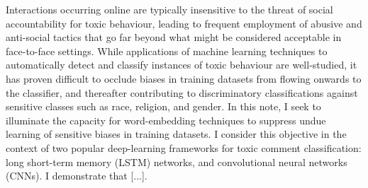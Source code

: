 Interactions occurring online are typically insensitive to the threat of social accountability for toxic behaviour, leading to frequent employment of abusive and anti-social tactics that go far beyond what might be considered acceptable in face-to-face settings. 
While applications of machine learning techniques to automatically detect and classify instances of toxic behaviour are well-studied, it has proven difficult to occlude biases in training datasets from flowing onwards to the classifier, and thereafter contributing to discriminatory classifications against sensitive classes such as race, religion, and gender. 
In this note, I seek to illuminate the capacity for word-embedding techniques to suppress undue learning of sensitive biases in training datasets. 
I consider this objective in the context of two popular deep-learning frameworks for toxic comment classification: long short-term memory (LSTM) networks, and convolutional neural networks (CNNs). I demonstrate that [...].

